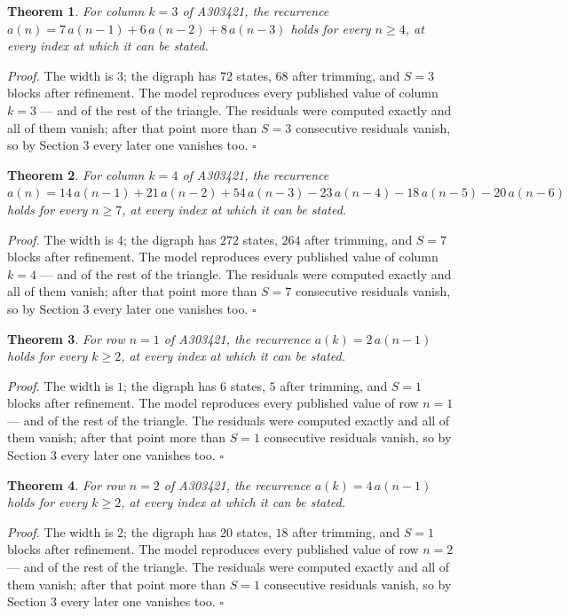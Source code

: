 \documentclass[11pt]{article}
\newtheorem{theorem}{Theorem}
\theoremstyle{definition}
\begin{document}
\begin{theorem} For column $k = 3$ of A303421, the recurrence $a(n) = 7\,a(n-1) + 6\,a(n-2) + 8\,a(n-3)$ holds for every $n \ge 4$, at every index at which it can be stated.\end{theorem}

{\itshape Proof.} The width is $3$; the digraph has $72$ states, $68$ after trimming, and $S = 3$ blocks after refinement. The model reproduces every published value of column $k = 3$ --- and of the rest of the triangle. The residuals were computed exactly and all of them vanish; after that point more than $S = 3$ consecutive residuals vanish, so by Section 3 every later one vanishes too. $\square$

\begin{theorem} For column $k = 4$ of A303421, the recurrence $a(n) = 14\,a(n-1) + 21\,a(n-2) + 54\,a(n-3) - 23\,a(n-4) - 18\,a(n-5) - 20\,a(n-6)$ holds for every $n \ge 7$, at every index at which it can be stated.\end{theorem}

{\itshape Proof.} The width is $4$; the digraph has $272$ states, $264$ after trimming, and $S = 7$ blocks after refinement. The model reproduces every published value of column $k = 4$ --- and of the rest of the triangle. The residuals were computed exactly and all of them vanish; after that point more than $S = 7$ consecutive residuals vanish, so by Section 3 every later one vanishes too. $\square$

\begin{theorem} For row $n = 1$ of A303421, the recurrence $a(k) = 2\,a(n-1)$ holds for every $k \ge 2$, at every index at which it can be stated.\end{theorem}

{\itshape Proof.} The width is $1$; the digraph has $6$ states, $5$ after trimming, and $S = 1$ blocks after refinement. The model reproduces every published value of row $n = 1$ --- and of the rest of the triangle. The residuals were computed exactly and all of them vanish; after that point more than $S = 1$ consecutive residuals vanish, so by Section 3 every later one vanishes too. $\square$

\begin{theorem} For row $n = 2$ of A303421, the recurrence $a(k) = 4\,a(n-1)$ holds for every $k \ge 2$, at every index at which it can be stated.\end{theorem}

{\itshape Proof.} The width is $2$; the digraph has $20$ states, $18$ after trimming, and $S = 1$ blocks after refinement. The model reproduces every published value of row $n = 2$ --- and of the rest of the triangle. The residuals were computed exactly and all of them vanish; after that point more than $S = 1$ consecutive residuals vanish, so by Section 3 every later one vanishes too. $\square$
\end{document}
